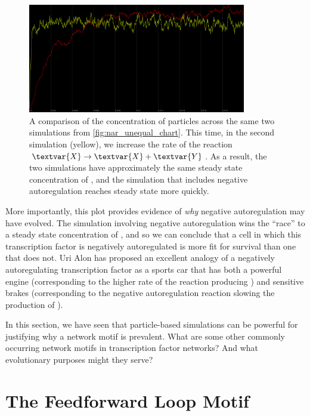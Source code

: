 \begin{figure}[h]
\centering
\mySfFamily
\includegraphics[width = 0.85\textwidth]{../images/cellblender_nar_equal_chart.png}
\caption{A comparison of the concentration of  particles across the same two simulations from \autoref{fig:nar_unequal_chart}. This time, in the second simulation (yellow), we increase the rate of the reaction $\textvar{X} \rightarrow \textvar{X} + \textvar{Y}$.  As a result, the two simulations have approximately the same steady state concentration of , and the simulation that includes negative autoregulation reaches steady state more quickly.}
\label{fig:nar_equal_chart}
\end{figure}

More importantly, this plot provides evidence of \textit{why} negative autoregulation may have evolved. The simulation involving negative autoregulation wins the ``race'' to a steady state concentration of , and so we can conclude that a cell in which this transcription factor is negatively autoregulated is more fit for survival than one that does not. Uri Alon has proposed an excellent analogy of a negatively autoregulating transcription factor as a sports car that has both a powerful engine (corresponding to the higher rate of the reaction producing ) and sensitive brakes (corresponding to the negative autoregulation reaction slowing the production of ).

In this section, we have seen that particle-based simulations can be powerful for justifying why a network motif is prevalent. What are some other commonly occurring network motifs in transcription factor networks? And what evolutionary purposes might they serve?\\


\FloatBarrier
{}

\section{The Feedforward Loop Motif}
\label{sec:the_feedforward_loop_motif}

